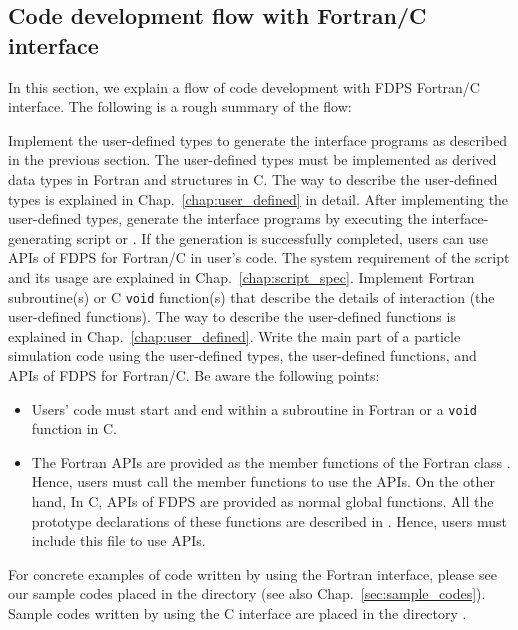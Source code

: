 \subsection{Code development flow with Fortran/C interface}
In this section, we explain a flow of code development with FDPS Fortran/C interface. The following is a rough summary of the flow:
\begin{enumerate}[leftmargin=*,label={[\arabic*]}]
 Implement the user-defined types to generate the interface programs as described in the previous section. The user-defined types must be implemented as  derived data types in Fortran and structures in C. The way to describe the user-defined types is explained in Chap.~\ref{chap:user_defined} in detail.
 After implementing the user-defined types, generate the interface programs by executing the interface-generating script  or . If the generation is successfully completed, users can use APIs of FDPS for Fortran/C in user's code. The system requirement of the script and its usage are explained in Chap.~\ref{chap:script_spec}.
 Implement Fortran subroutine(s) or C \texttt{void} function(s) that describe the details of interaction (the user-defined functions). The way to describe the user-defined functions is explained in Chap.~\ref{chap:user_defined}.
 Write the main part of a particle simulation code using the user-defined types, the user-defined functions, and APIs of FDPS for Fortran/C. Be aware the following points:
\begin{itemize}
\item Users' code must start and end within a subroutine  in Fortran or a \texttt{void} function  in C.
\item The Fortran APIs are provided as the member functions of the Fortran class . Hence, users must call the member functions to use the APIs. On the other hand, In C, APIs of FDPS are provided as normal global functions. All the prototype declarations of these functions are described in . Hence, users must include this file to use APIs.
\end{itemize}
For concrete examples of code written by using the Fortran interface, please see our sample codes placed in the directory  (see also Chap.~\ref{sec:sample_codes}). Sample codes written by using the C interface are placed in the directory .

\end{enumerate}
